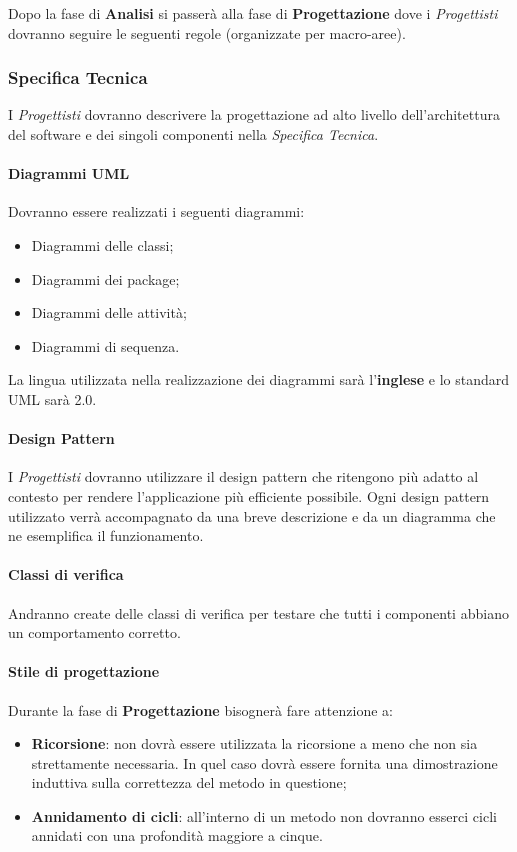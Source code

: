 Dopo la fase di \textbf{Analisi} si passerà alla fase di \textbf{Progettazione} dove i \textit{Progettisti} dovranno seguire le seguenti regole (organizzate per macro-aree).\\
\subsubsection{Specifica Tecnica}
I \textit{Progettisti} dovranno descrivere la progettazione ad alto livello dell'architettura del software e dei singoli componenti nella \textit{Specifica Tecnica}.

\paragraph{Diagrammi UML}
Dovranno essere realizzati i seguenti diagrammi:
\begin{itemize}
	\item Diagrammi delle classi;
	\item Diagrammi dei package;
	\item Diagrammi delle attività;
	\item Diagrammi di sequenza.
\end{itemize}
La lingua utilizzata nella realizzazione dei diagrammi sarà l'\textbf{inglese} e lo standard \gls{UML} sarà 2.0.

\paragraph{Design Pattern}
I \textit{Progettisti} dovranno utilizzare il \gls{design pattern} che ritengono più adatto al contesto per rendere l'applicazione più efficiente possibile. Ogni \gls{design pattern} utilizzato verrà accompagnato da una breve descrizione e da un diagramma che ne esemplifica il funzionamento.

\paragraph{Classi di verifica}
Andranno create delle classi di verifica per testare che tutti i componenti abbiano un comportamento corretto.

\paragraph{Stile di progettazione}
Durante la fase di \textbf{Progettazione} bisognerà fare attenzione a:
\begin{itemize}
	\item \textbf{Ricorsione}: non dovrà essere utilizzata la ricorsione a meno che non sia strettamente necessaria. In quel caso dovrà essere fornita una dimostrazione induttiva sulla correttezza del metodo in questione;
	\item \textbf{Annidamento di cicli}: all'interno di un metodo non dovranno esserci cicli annidati con una profondità maggiore a cinque.
\end{itemize}




